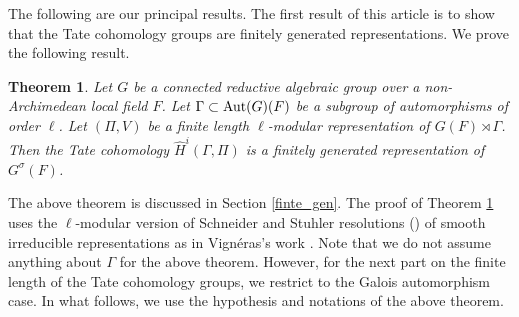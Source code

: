 \documentclass[10pt, reqno]{amsart}
\theoremstyle{plain}
\numberwithin{equation}{section} \newcommand{\di}{\operatorname{dim}}
\newtheorem{theorem}{Theorem}[subsection]
\begin{document}
The following are our principal results.
The first result of this article is to show that the
Tate cohomology groups are finitely generated representations. We
prove the following result.
\begin{theorem}\label{intro_finite_gen}
  Let $G$ be a connected reductive algebraic group over a
  non-Archimedean local field $F$. Let $\Gamma\subset {\rm Aut}(G)(F)$
  be a subgroup of automorphisms of order $\ell$. Let $(\Pi, V)$ be a
  finite length $\ell$-modular representation of
  $G(F)\rtimes\Gamma$. Then the Tate cohomology
  $\widehat{H}^i(\Gamma, \Pi)$ is a finitely generated representation
  of $G^\sigma(F)$.
\end{theorem}
The above theorem is discussed in Section \ref{finte_gen}.
The proof of Theorem \ref{intro_finite_gen} uses the $\ell$-modular version of
Schneider and Stuhler resolutions (\cite[Theorem II.3.1]{Schneider_Stuhler})
of smooth irreducible
representations as in Vign\'eras's work \cite[Proposition 2.6]{vigneras_reso}.
Note that we do not assume anything about $\Gamma$ for the above theorem. 
However, for the next part on the finite length of the Tate cohomology groups, 
we restrict to the Galois automorphism case. 
In what follows, we use the
hypothesis and notations of the above theorem. 
\end{document}

